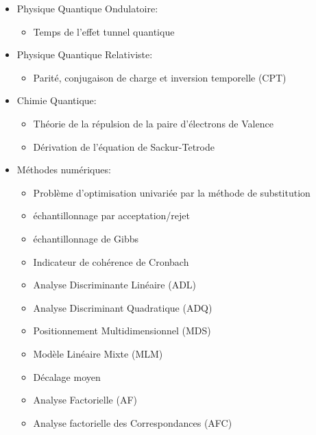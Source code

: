 \begin{itemize}
\begin{itemize}
				\item Spin (h\'elicit\'e) et relation de polarit\'e du photon
				\item Les in\'egalit\'es de Bell
				\item L'in\'egalit\'e de Kennard des incertitudes de Heisenberg
				\item Calcul d\'etaill\'e du d\'eplacement Lamb
				\item Exp\'erience de Davisson-Germer
				\item Formalisme du paradoxe EPR
			\end{itemize}
		\item Physique Quantique Ondulatoire:
			\begin{itemize}
				\item Temps de l'effet tunnel quantique
			\end{itemize}
		\item Physique Quantique Relativiste:
			\begin{itemize}
				\item Parit\'e, conjugaison de charge et inversion temporelle (CPT)
			\end{itemize}
		\item Chimie Quantique:
			\begin{itemize}
				\item Th\'eorie de la r\'epulsion de la paire d'\'electrons de Valence
				\item D\'erivation de l'\'equation de Sackur-Tetrode
			\end{itemize}
		\item M\'ethodes num\'eriques: 
			\begin{itemize}
				\item Problème d'optimisation univari\'ee par la m\'ethode de substitution				
				\item \'echantillonnage par acceptation/rejet
				\item \'echantillonnage de Gibbs
				\item Indicateur de coh\'erence de Cronbach
				\item Analyse Discriminante Lin\'eaire (ADL)
				\item Analyse Discriminant Quadratique (ADQ)
				\item Positionnement Multidimensionnel (MDS)
				\item Modèle Lin\'eaire Mixte (MLM)
				\item D\'ecalage moyen
				\item Analyse Factorielle (AF)
				\item Analyse factorielle des Correspondances (AFC)

\end{itemize}
\end{itemize}
